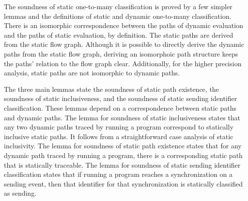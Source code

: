 \documentclass[letterpaper, 11pt]{report}
\begin{document}
The soundness of static one-to-many classification is proved by a few simpler lemmas and the
definitions of static and dynamic one-to-many classification.
There is an isomorphic correspondence between the paths of
dynamic evaluation and the paths of static evaluation, by definition.
The static paths are derived from the static flow graph. Although it is possible to directly derive
the dynamic paths from the static flow graph, deriving an isomorphoic path structure keeps the
paths' relation to the flow graph clear. Additionally, for the higher precision analysis, static
paths are not isomorphic to dynamic paths. 

The three main lemmas state the
soundness of static path existence, the soundness of static inclusiveness, and
the soundness of static sending identifier classification. These lemmas depend on a
correspondence between static paths and dynamic paths.
The lemma for soundness of static inclusiveness states that any two
dynamic paths traced by running a program correspond to statically inclusive static paths. It
follows from a straightforward case analysis of static inclusivity. The lemma for soundness of
static path existence states that for any dynamic path traced by running a program, there
is a corresponding static path that is statically traceable. The lemma for soundness of
static sending identifier classification states that if running a program reaches a
synchronization on a sending event, then that identifier for that synchronization
is statically classified as sending.
\end{document}
